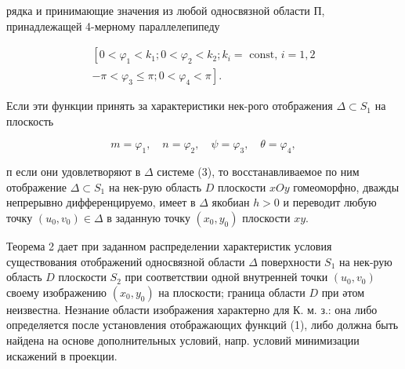 \documentclass[10pt]{article}
\begin{document}
рядка и принимающие значения из любой односвязной области П, принадлежащей 4-мерному параллелепипеду



\[

\begin{gathered}

{\left[0<\varphi_{1}<k_{1} ; 0<\varphi_{2}<k_{2} ; k_{i}=\text { const, } i=1,2\right.} \\

\left.-\pi<\varphi_{3} \leqslant \pi ; 0<\varphi_{4}<\pi\right] .

\end{gathered}

\]



Если эти функции принять за характеристики нек-рого отображения $\Delta \subset S_{1}$ на плоскость



\[

m=\varphi_{1}, \quad n=\varphi_{2}, \quad \psi=\varphi_{3}, \quad \theta=\varphi_{4},

\]



п если они удовлетворяют в $\Delta$ системе (3), то восстанавливаемое по ним отображение $\Delta \subset S_{1}$ на нек-рую область $D$ плоскости $x O y$ гомеоморфно, дважды непрерывно дифференцируемо, имеет в $\Delta$ якобиан $h>0$ и переводит любую точку $\left(u_{0}, v_{0}\right) \in \Delta$ в заданную точку $\left(x_{0}, y_{0}\right)$ плоскости $x y$.



Теорема 2 дает при заданном распределении характеристик условия существования отображений односвязной области $\Delta$ поверхности $S_{1}$ на нек-рую область $D$ плоскости $S_{2}$ при соответствии одной внутренней точки $\left(u_{0}, v_{0}\right)$ своему изображению $\left(x_{0}, y_{0}\right)$ на плоскости; граница области $D$ при әтом неизвестна. Незнание области изображения характерно для К. м. з.: она либо определяется после установления отображающих функций (1), либо должна быть найдена на основе дополнительных условий, напр. условий минимизации искажений в проекции.
\end{document}
